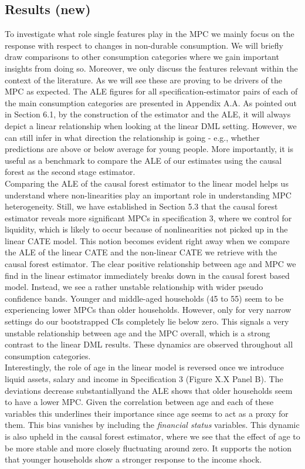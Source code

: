 \subsection{Results (new)} 
To investigate what role single features play in the MPC we mainly focus on the response with respect to changes in non-durable consumption. We will briefly draw comparisons to other consumption categories where we gain important insights from doing so. Moreover, we only discuss the features relevant within the context of the literature. As we will see these are proving to be drivers of the MPC as expected. The ALE figures for all specification-estimator pairs of each of the main consumption categories are presented in Appendix A.A. As pointed out in Section 6.1, by the construction of the estimator and the ALE, it will always depict a linear relationship when looking at the linear DML setting. However, we can still infer in what direction the relationship is going - e.g., whether predictions are above or below average for young people. More importantly, it is useful as a benchmark to compare the ALE of our estimates using the causal forest as the second stage estimator. \\
Comparing the ALE of the causal forest estimator to the linear model helps us understand where non-linearities play an important role in understanding MPC heterogeneity. Still, we have established in Section 5.3 that the causal forest estimator reveals more significant MPCs in specification 3, where we control for liquidity, which is likely to occur because of nonlinearities not picked up in the linear CATE model. This notion becomes evident right away when we compare the ALE of the linear CATE and the non-linear CATE we retrieve with the causal forest estimator. The clear positive relationship between age and MPC we find in the linear estimator immediately breaks down in the causal forest based model. Instead, we see a rather unstable relationship with wider pseudo confidence bands. Younger and middle-aged households (45 to 55) seem to be experiencing lower MPCs than older households. However, only for very narrow settings do our bootstrapped CIs completely lie below zero. This signals a very unstable relationship between age and the MPC overall, which is a strong contrast to the linear DML results. These dynamics are observed throughout all consumption categories. \\
Interestingly, the role of age in the linear model is reversed once we introduce liquid assets, salary and income in Specification 3 (Figure X.X Panel B). The deviations decrease substantiallyand the ALE shows that older households seem to have a lower MPC. Given the correlation between age and each of these variables this underlines their importance since age seems to act as a proxy for them. This bias vanishes by including the \textit{financial status} variables. This dynamic is also upheld in the causal forest estimator, where we see that the effect of age to be more stable and more closely fluctuating around zero. It supports the notion that younger households show a stronger response to the income shock. \\
